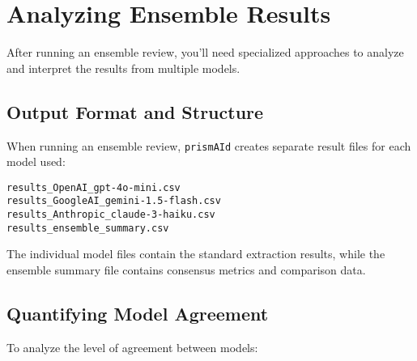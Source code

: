 
\section{Analyzing Ensemble Results}

After running an ensemble review, you'll need specialized approaches to analyze and interpret the results from multiple models.

\subsection{Output Format and Structure}

When running an ensemble review, \texttt{prismAId} creates separate result files for each model used:

\begin{commandbox}
\begin{lstlisting}
results_OpenAI_gpt-4o-mini.csv
results_GoogleAI_gemini-1.5-flash.csv
results_Anthropic_claude-3-haiku.csv
results_ensemble_summary.csv
\end{lstlisting}
\end{commandbox}

The individual model files contain the standard extraction results, while the ensemble summary file contains consensus metrics and comparison data.

\subsection{Quantifying Model Agreement}

To analyze the level of agreement between models:


